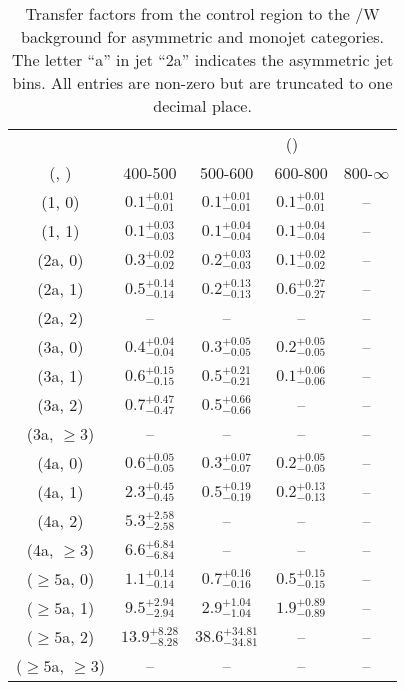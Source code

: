 \begin{table}[h!]
\tiny
\centering
\caption{Transfer factors from the \gj control region to the \ttbar/W background for asymmetric and monojet categories. The letter ``a'' in jet \eg ``2a''  indicates the asymmetric jet bins. All entries are non-zero but are truncated to one decimal place.\label{tab:tf_ttw_gj_asym}}
\begin{tabular}
{ccccc}
	\hline\hline
&	& \multicolumn{4}{c}{\scalht (\gev)} \\ 
	 (\njet,  \nb) & 400-500 & 500-600 & 600-800 & 800-$\infty$ \\ [0.8ex] 
\hline
	(1, 0) & $0.1^{+ 0.01 }_{- 0.01 }$ & $0.1^{+ 0.01 }_{- 0.01 }$ & $0.1^{+ 0.01 }_{- 0.01 }$ & -- \\[0.5ex] 
	(1, 1) & $0.1^{+ 0.03 }_{- 0.03 }$ & $0.1^{+ 0.04 }_{- 0.04 }$ & $0.1^{+ 0.04 }_{- 0.04 }$ & -- \\[0.5ex] 
	(2a, 0) & $0.3^{+ 0.02 }_{- 0.02 }$ & $0.2^{+ 0.03 }_{- 0.03 }$ & $0.1^{+ 0.02 }_{- 0.02 }$ & -- \\[0.5ex] 
	(2a, 1) & $0.5^{+ 0.14 }_{- 0.14 }$ & $0.2^{+ 0.13 }_{- 0.13 }$ & $0.6^{+ 0.27 }_{- 0.27 }$ & -- \\[0.5ex] 
	(2a, 2) & -- & -- & -- & -- \\[0.5ex] 
	(3a, 0) & $0.4^{+ 0.04 }_{- 0.04 }$ & $0.3^{+ 0.05 }_{- 0.05 }$ & $0.2^{+ 0.05 }_{- 0.05 }$ & -- \\[0.5ex] 
	(3a, 1) & $0.6^{+ 0.15 }_{- 0.15 }$ & $0.5^{+ 0.21 }_{- 0.21 }$ & $0.1^{+ 0.06 }_{- 0.06 }$ & -- \\[0.5ex] 
	(3a, 2) & $0.7^{+ 0.47 }_{- 0.47 }$ & $0.5^{+ 0.66 }_{- 0.66 }$ & -- & -- \\[0.5ex] 
	(3a, $\ge3$) & -- & -- & -- & -- \\[0.5ex] 
	(4a, 0) & $0.6^{+ 0.05 }_{- 0.05 }$ & $0.3^{+ 0.07 }_{- 0.07 }$ & $0.2^{+ 0.05 }_{- 0.05 }$ & -- \\[0.5ex] 
	(4a, 1) & $2.3^{+ 0.45 }_{- 0.45 }$ & $0.5^{+ 0.19 }_{- 0.19 }$ & $0.2^{+ 0.13 }_{- 0.13 }$ & -- \\[0.5ex] 
	(4a, 2) & $5.3^{+ 2.58 }_{- 2.58 }$ & -- & -- & -- \\[0.5ex] 
	(4a, $\ge3$) & $6.6^{+ 6.84 }_{- 6.84 }$ & -- & -- & -- \\[0.5ex] 
	($\ge5$a, 0) & $1.1^{+ 0.14 }_{- 0.14 }$ & $0.7^{+ 0.16 }_{- 0.16 }$ & $0.5^{+ 0.15 }_{- 0.15 }$ & -- \\[0.5ex] 
	($\ge5$a, 1) & $9.5^{+ 2.94 }_{- 2.94 }$ & $2.9^{+ 1.04 }_{- 1.04 }$ & $1.9^{+ 0.89 }_{- 0.89 }$ & -- \\[0.5ex] 
	($\ge5$a, 2) & $13.9^{+ 8.28 }_{- 8.28 }$ & $38.6^{+ 34.81 }_{- 34.81 }$ & -- & -- \\[0.5ex] 
	($\ge5$a, $\ge3$) & -- & -- & -- & -- \\[0.5ex] 
	\hline
	\hline
\end{tabular}
\end{table}
